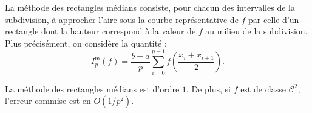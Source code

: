 La méthode des rectangles médians consiste, pour chacun des intervalles de la subdivision, à approcher l'aire sous la courbe représentative de $f$ par celle d'un rectangle dont la hauteur correspond à la valeur de $f$ au milieu de la subdivision. Plus précisément, on considère la quantité :
\[
I_p^\mathrm{m}(f) = \frac{b-a}{p} \sum_{i=0}^{p-1} f\left(\frac{x_i + x_{i+1}}{2} \right).
\]

\begin{prop}{}{}
La méthode des rectangles médians est d'ordre $1$. De plus, si $f$ est de classe $\mathscr{C}^2$, l'erreur commise est en $O(1/p^2)$.
\end{prop}

\begin{marginfigure}[0cm]
    \centering
    
\end{marginfigure}

